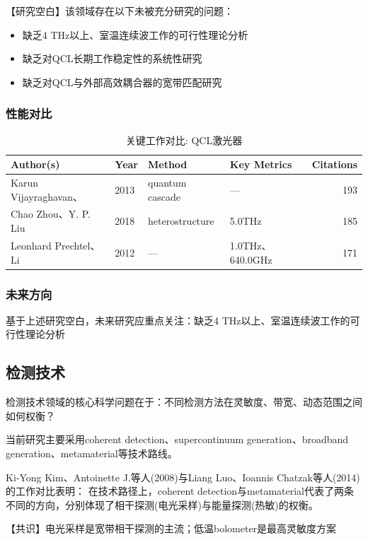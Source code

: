\documentclass[reprint,amsmath,amssymb,aps,floatfix]{revtex4-2}
\begin{document}
\par\par{【研究空白】该领域存在以下未被充分研究的问题：}
\begin{itemize}
\item 缺乏4 THz以上、室温连续波工作的可行性理论分析
\item 缺乏对QCL长期工作稳定性的系统性研究
\item 缺乏对QCL与外部高效耦合器的宽带匹配研究
\end{itemize}

\subsubsection*{性能对比}
\begin{table}[h!]
\caption{关键工作对比: QCL激光器}
\begin{tabular}{@{}llp{2.5cm}p{2.5cm}r@{}}
\hline
Author(s) & Year & Method & Key Metrics & Citations\\
\hline
Karun Vijayraghavan、 & 2013 & quantum cascade & --- & 193\\
Chao Zhou、Y. P. Liu & 2018 & heterostructure & 5.0THz & 185\\
Leonhard Prechtel、Li & 2012 & --- & 1.0THz、640.0GHz & 171\\
\hline
\end{tabular}
\end{table}

\subsubsection*{未来方向}
基于上述研究空白，未来研究应重点关注：缺乏4 THz以上、室温连续波工作的可行性理论分析

\subsection{检测技术}
\par\par{检测技术领域的核心科学问题在于：不同检测方法在灵敏度、带宽、动态范围之间如何权衡？}

\par\par{当前研究主要采用coherent detection、supercontinuum generation、broadband generation、metamaterial等技术路线。}
\par\par{Ki‐Yong Kim、Antoinette J.等人(2008)与Liang Luo、Ioannis Chatzak等人(2014)的工作对比表明：}
在技术路径上，coherent detection与metamaterial代表了两条不同的方向，分别体现了相干探测(电光采样)与能量探测(热敏)的权衡。
\par\par{【共识】电光采样是宽带相干探测的主流；低温bolometer是最高灵敏度方案}
\end{document}
